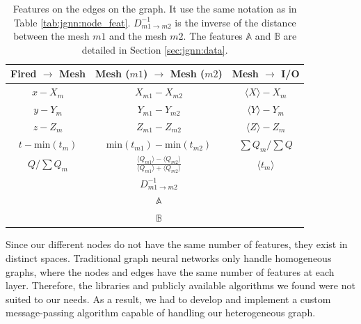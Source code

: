 \documentclass[../main.tex]{subfiles}
\begin{document}
\begin{table}
  \centering
  \begin{tabular}{|c|c|c|}
    \hline
    Fired $\rightarrow$ Mesh & Mesh ($m1$) $\rightarrow$ Mesh ($m2$) & Mesh $\rightarrow$ I/O \\
    \hline \hline
    $x - X_m$ & $X_{m1} - X_{m2}$ & $\langle X \rangle - X_m$ \\
    $y - Y_m$ & $Y_{m1} - Y_{m2}$ & $\langle Y \rangle - Y_m$ \\
    $z - Z_m$ & $Z_{m1} - Z_{m2}$ & $\langle Z \rangle - Z_m$ \\
    $t - \mathrm{min}(t_m)$ & $\mathrm{min}(t_{m1}) - \mathrm{min}(t_{m2})$ & $\sum Q_m / \sum Q$ \\
    $Q / \sum Q_m$ & $\frac{\langle Q_{m1} \rangle - \langle Q_{m2} \rangle}{\langle Q_{m1} \rangle + \langle Q_{m2} \rangle}$ & $\langle t_m \rangle$ \\
     & $D^{-1}_{m1 \rightarrow m2}$ & \\
     & $\mathbb{A}$ & \\
     & $\mathbb{B}$ & \\
    \hline
  \end{tabular}
  \caption{Features on the edges on the graph. It use the same notation as in Table \ref{tab:jgnn:node_feat}. $D^{-1}_{m1 \rightarrow m2}$ is the inverse of the distance between the mesh $m1$ and the mesh $m2$. The features $\mathbb{A}$ and $\mathbb{B}$ are detailed in Section \ref{sec:jgnn:data}.}
  \label{tab:jgnn:edge_feat}

\end{table}

Since our different nodes do not have the same number of features, they exist in distinct spaces. Traditional graph neural networks only handle homogeneous graphs, where the nodes and edges have the same number of features at each layer. Therefore, the libraries and publicly available algorithms we found were not suited to our needs. As a result, we had to develop and implement a custom message-passing algorithm capable of handling our heterogeneous graph.
\end{document}
